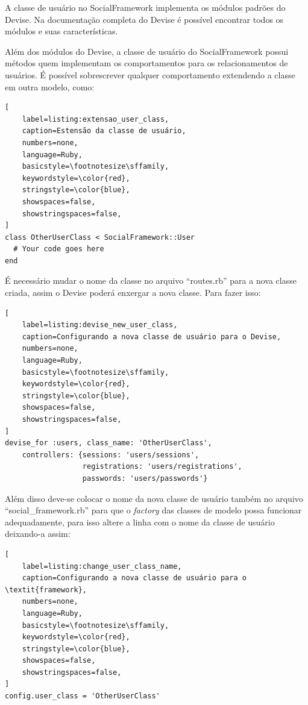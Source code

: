 A classe de usuário no SocialFramework implementa os módulos padrões do Devise. Na documentação completa do Devise é possível encontrar todos os módulos e suas características.

Além dos módulos do Devise, a classe de usuário do SocialFramework possui métodos quem implementam os comportamentos para os relacionamentos de usuários. É possível sobrescrever qualquer comportamento extendendo a classe em outra modelo, como:

\begin{lstlisting}[
    label=listing:extensao_user_class,
    caption=Estensão da classe de usuário,
    numbers=none,
    language=Ruby,
    basicstyle=\footnotesize\sffamily,
    keywordstyle=\color{red},
    stringstyle=\color{blue},
    showspaces=false,
    showstringspaces=false,
]
class OtherUserClass < SocialFramework::User
  # Your code goes here
end
\end{lstlisting}

É necessário mudar o nome da classe no arquivo ``routes.rb'' para a nova classe criada, assim o Devise poderá enxergar a nova classe. Para fazer isso:

\begin{lstlisting}[
    label=listing:devise_new_user_class,
    caption=Configurando a nova classe de usuário para o Devise,
    numbers=none,
    language=Ruby,
    basicstyle=\footnotesize\sffamily,
    keywordstyle=\color{red},
    stringstyle=\color{blue},
    showspaces=false,
    showstringspaces=false,
]
devise_for :users, class_name: 'OtherUserClass',
    controllers: {sessions: 'users/sessions',
                  registrations: 'users/registrations',
                  passwords: 'users/passwords'}
\end{lstlisting}

Além disso deve-se colocar o nome da nova classe de usuário também no arquivo ``social\_framework.rb'' para que o \textit{factory} das classes de modelo possa funcionar adequadamente, para isso altere a linha com o nome da classe de usuário deixando-a assim:

\begin{lstlisting}[
    label=listing:change_user_class_name,
    caption=Configurando a nova classe de usuário para o \textit{framework},
    numbers=none,
    language=Ruby,
    basicstyle=\footnotesize\sffamily,
    keywordstyle=\color{red},
    stringstyle=\color{blue},
    showspaces=false,
    showstringspaces=false,
]
config.user_class = 'OtherUserClass'
\end{lstlisting}

